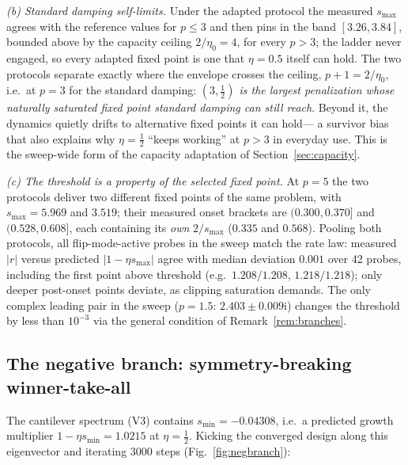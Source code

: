 \documentclass[11pt,a4paper]{article}
\newcommand{\smax}{s_{\max}}
\newcommand{\smin}{s_{\min}}
\begin{document}
\emph{(b) Standard damping self-limits.} Under the adapted protocol the
measured $\smax$ agrees with the reference values for $p\le3$ and then
pins in the band $[3.26,3.84]$, bounded above by the capacity ceiling
$2/\eta_0=4$, for every $p>3$; the ladder never engaged, so every adapted
fixed point is one that $\eta=0.5$ itself can hold. The two protocols
separate exactly where
the envelope crosses the ceiling, $p{+}1=2/\eta_0$, i.e.\ at $p=3$ for the
standard damping: \emph{$(3,\tfrac12)$ is the largest penalization whose
naturally saturated fixed point standard damping can still reach}. Beyond
it, the dynamics quietly drifts to alternative fixed points it can hold---
a survivor bias that also explains why $\eta=\tfrac12$ ``keeps working''
at $p>3$ in everyday use. This is the sweep-wide form of the capacity
adaptation of Section~\ref{sec:capacity}.

\emph{(c) The threshold is a property of the selected fixed point.} At
$p=5$ the two protocols deliver two different fixed points of the same
problem, with $\smax=5.969$ and $3.519$; their measured onset brackets are
$(0.300,0.370]$ and $(0.528,0.608]$, each containing its \emph{own}
$2/\smax$ ($0.335$ and $0.568$). Pooling both protocols, all
flip-mode-active probes in the sweep match the rate law: measured $|r|$
versus predicted $|1-\eta\smax|$ agree with median deviation $0.001$
over 42 probes, including the first point above threshold (e.g.\
$1.208/1.208$, $1.218/1.218$); only deeper post-onset points deviate, as
clipping saturation demands. The only complex leading pair in the sweep
($p=1.5$: $2.403\pm0.009\mathrm i$) changes the threshold by less than
$10^{-3}$ via the general condition of Remark~\ref{rem:branches}.

\subsection{The negative branch: symmetry-breaking winner-take-all}
\label{sec:neg}

The cantilever spectrum (V3) contains $\smin=-0.04308$, i.e.\ a predicted
growth multiplier $1-\eta\smin=1.0215$ at $\eta=\tfrac12$. Kicking the
converged design along this eigenvector and iterating 3000 steps
(Fig.~\ref{fig:negbranch}):
\end{document}
